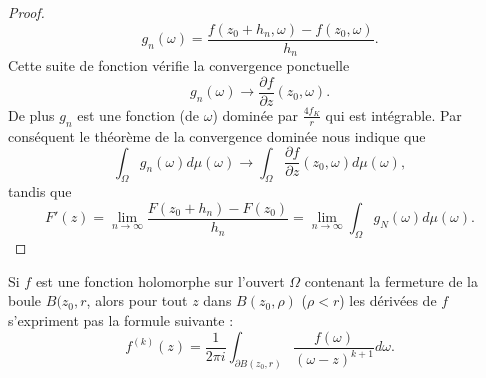 \begin{proof}
\begin{equation}
        g_n(\omega)=\frac{ f(z_0+h_n,\omega)-f(z_0,\omega) }{ h_n }.
    \end{equation}
    Cette suite de fonction vérifie la convergence ponctuelle
    \begin{equation}
        g_n(\omega)\to\frac{ \partial f }{ \partial z }(z_0,\omega).
    \end{equation}
    De plus \( g_n\) est une fonction (de \( \omega\)) dominée par \( \frac{ 4f_K }{ r }\) qui est intégrable. Par conséquent le théorème de la convergence dominée nous indique que
    \begin{equation}
        \int_{\Omega}g_n(\omega)d\mu(\omega)\to \int_{\Omega}\frac{ \partial f }{ \partial z }(z_0,\omega)d\mu(\omega),
    \end{equation}
    tandis que
    \begin{equation}
        F'(z)=\lim_{n\to \infty} \frac{ F(z_0+h_n)-F(z_0) }{ h_n }=\lim_{n\to \infty} \int_{\Omega}g_N(\omega)d\mu(\omega).
    \end{equation}
\end{proof}

\begin{corollary}       \label{CorNxTjEj}
    Si \( f\) est une fonction holomorphe sur l'ouvert \( \Omega\) contenant la fermeture de la boule \( B(z_0,r\), alors pour tout \( z\) dans \( B(z_0,\rho)\) (\( \rho<r\)) les dérivées de \( f\) s'expriment pas la formule suivante :
    \begin{equation}
        f^{(k)}(z)=\frac{1}{ 2\pi i }\int_{\partial B(z_0,r)}\frac{ f(\omega) }{ (\omega-z)^{k+1} }d\omega.
    \end{equation}
\end{corollary}

